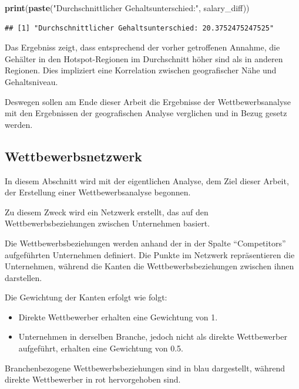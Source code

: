 \documentclass[
]{article}
\newenvironment{Shaded}{\begin{snugshade}}{\end{snugshade}}
\newcommand{\FunctionTok}[1]{\textcolor[rgb]{0.13,0.29,0.53}{\textbf{#1}}}
\newcommand{\NormalTok}[1]{#1}
\newcommand{\StringTok}[1]{\textcolor[rgb]{0.31,0.60,0.02}{#1}}
\providecommand{\tightlist}{%
  \setlength{\itemsep}{0pt}\setlength{\parskip}{0pt}}
\begin{document}
\begin{Shaded}
\begin{Highlighting}[]
\FunctionTok{print}\NormalTok{(}\FunctionTok{paste}\NormalTok{(}\StringTok{"Durchschnittlicher Gehaltsunterschied:"}\NormalTok{, salary\_diff))}
\end{Highlighting}
\end{Shaded}

\begin{verbatim}
## [1] "Durchschnittlicher Gehaltsunterschied: 20.3752475247525"
\end{verbatim}

Das Ergebniss zeigt, dass entsprechend der vorher getroffenen Annahme,
die Gehälter in den Hotspot-Regionen im Durchschnitt höher sind als in
anderen Regionen. Dies impliziert eine Korrelation zwischen
geografischer Nähe und Gehaltsniveau.

Deswegen sollen am Ende dieser Arbeit die Ergebnisse der
Wettbewerbsanalyse mit den Ergebnissen der geografischen Analyse
verglichen und in Bezug gesetz werden.

\subsection{Wettbewerbsnetzwerk}\label{wettbewerbsnetzwerk}

In diesem Abschnitt wird mit der eigentlichen Analyse, dem Ziel dieser
Arbeit, der Erstellung einer Wettbewerbsanalyse begonnen.

Zu diesem Zweck wird ein Netzwerk erstellt, das auf den
Wettbewerbsbeziehungen zwischen Unternehmen basiert.

Die Wettbewerbsbeziehungen werden anhand der in der Spalte
``Competitors'' aufgeführten Unternehmen definiert. Die Punkte im
Netzwerk repräsentieren die Unternehmen, während die Kanten die
Wettbewerbsbeziehungen zwischen ihnen darstellen.

Die Gewichtung der Kanten erfolgt wie folgt:

\begin{itemize}
\tightlist
\item
  Direkte Wettbewerber erhalten eine Gewichtung von 1.
\item
  Unternehmen in derselben Branche, jedoch nicht als direkte
  Wettbewerber aufgeführt, erhalten eine Gewichtung von 0.5.
\end{itemize}

Branchenbezogene Wettbewerbsbeziehungen sind in blau dargestellt,
während direkte Wettbewerber in rot hervorgehoben sind.
\end{document}

